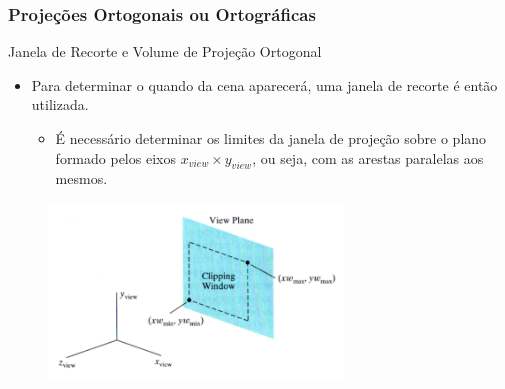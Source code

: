\documentclass{beamer}
\begin{document}
\begin{frame}
\frametitle{Projeções Ortogonais ou Ortográficas}
	\begin{block}{Janela de Recorte e Volume de Projeção Ortogonal}
		\begin{itemize}
			\item Para determinar o quando da cena aparecerá, uma janela de recorte é então utilizada.
			\begin{itemize}
				\item É necessário determinar os limites da janela de projeção sobre o plano formado pelos eixos $x_{view} \times y_{view}$, ou seja, com as arestas paralelas aos mesmos.
			\end{itemize}
		\end{itemize}
	\end{block}
	\begin{figure}[!h]
			\begin{center}
			\includegraphics[width=0.7\textwidth]{Figures/PlaProXY}
			\end{center}
	\end{figure}
\end{frame}
\end{document}
